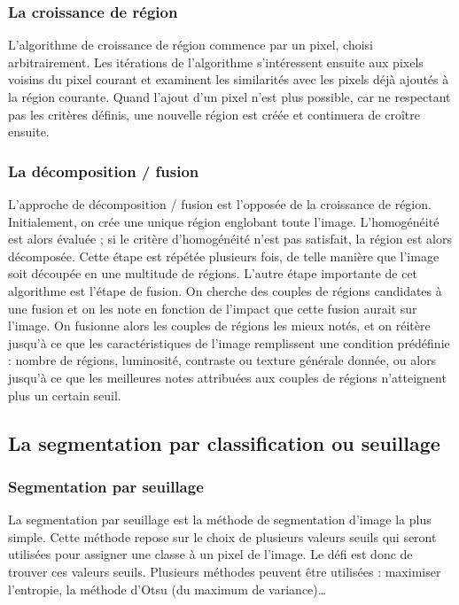 	\subsubsection{La croissance de région}
		L'algorithme de croissance de région commence par un pixel, choisi arbitrairement. Les itérations de l'algorithme s'intéressent ensuite aux pixels voisins du pixel courant et examinent les similarités avec les pixels déjà ajoutés à la région courante. Quand l'ajout d'un pixel n'est plus possible, car ne respectant pas les critères définis, une nouvelle région est créée et continuera de croître ensuite.\cite{spatialSegmentation}

	\subsubsection{La décomposition / fusion}
		L'approche de décomposition / fusion est l'opposée de la croissance de région. Initialement, on crée une unique région englobant toute l'image. L'homogénéité est alors évaluée ; si le critère d'homogénéité n'est pas satisfait, la région est alors décomposée. Cette étape est répétée plusieurs fois, de telle manière que l'image soit découpée en une multitude de régions. L'autre étape importante de cet algorithme est l'étape de fusion. On cherche des couples de régions candidates à une fusion et on les note en fonction de l'impact que cette fusion aurait sur l'image. On fusionne alors les couples de régions les mieux notés, et on réitère jusqu’à ce que les caractéristiques de l'image remplissent une condition prédéfinie : nombre de régions, luminosité, contraste ou texture générale donnée, ou alors jusqu’à ce que les meilleures notes attribuées aux couples de régions n'atteignent plus un certain seuil.

\subsection{La segmentation par classification ou seuillage}
	\subsubsection{Segmentation par seuillage}
		La segmentation par seuillage est la méthode de segmentation d'image la plus simple. Cette méthode repose sur le choix de plusieurs valeurs seuils qui seront utilisées pour assigner une classe à un pixel de l'image. Le défi est donc de trouver ces valeurs seuils. Plusieurs méthodes peuvent être utilisées : maximiser l'entropie, la méthode d'Otsu (du maximum de variance)\dots

